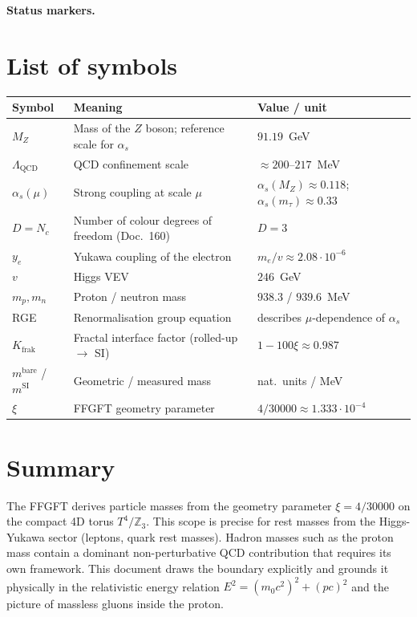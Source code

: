 
\medskip\noindent\textbf{Status markers.}


\section*{List of symbols}

\begin{center}
\begin{tabular}{lll}
\toprule
Symbol & Meaning & Value / unit \\
\midrule
$M_Z$ & Mass of the $Z$ boson; reference scale for $\alpha_s$ & $91.19$~GeV \\
$\Lambda_{\mathrm{QCD}}$ & QCD confinement scale & $\approx 200$--$217$~MeV \\
$\alpha_s(\mu)$ & Strong coupling at scale $\mu$ & $\alpha_s(M_Z) \approx 0.118$; $\alpha_s(m_\tau) \approx 0.33$ \\
$D = N_c$ & Number of colour degrees of freedom (Doc.~160) & $D = 3$ \\
$y_e$ & Yukawa coupling of the electron & $m_e/v \approx 2.08 \cdot 10^{-6}$ \\
$v$ & Higgs VEV & $246$~GeV \\
$m_p, m_n$ & Proton / neutron mass & $938.3$ / $939.6$~MeV \\
RGE & Renormalisation group equation & describes $\mu$-dependence of $\alpha_s$ \\
$K_{\text{frak}}$ & Fractal interface factor (rolled-up $\to$ SI) & $1-100\xi \approx 0.987$ \\
$m^{\text{bare}}$ / $m^{\text{SI}}$ & Geometric / measured mass & nat.~units / MeV \\
$\xi$ & FFGFT geometry parameter & $4/30000 \approx 1.333 \cdot 10^{-4}$ \\
\bottomrule
\end{tabular}
\end{center}

\section*{Summary}

The FFGFT derives particle masses from the geometry parameter
$\xi = 4/30000$ on the compact 4D torus $T^4/\mathbb{Z}_3$. This scope
is precise for rest masses from the Higgs-Yukawa sector (leptons, quark
rest masses). Hadron masses such as the proton mass contain a dominant
non-perturbative QCD contribution that requires its own framework. This
document draws the boundary explicitly and grounds it physically in the
relativistic energy relation $E^2 = (m_0 c^2)^2 + (pc)^2$ and the
picture of massless gluons inside the proton.

